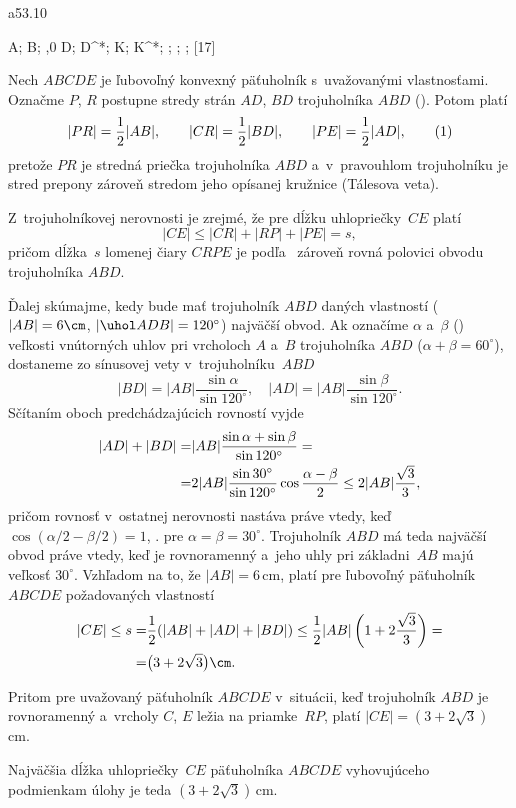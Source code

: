 {%
\epsplace a53.10 \hfil\Obr

\fontplace
\trpoint A; \tlpoint B;
\bpoint{},0 D; \bpoint D^*;
\lBpoint K; \lBpoint K^*;
\cpoint\omega; \cpoint\omega; \cpoint{}\omega;
[17] \hfil\Obr

Nech $ABCDE$ je ľubovoľný konvexný päťuholník s~uvažovanými
vlastnosťami. Označme $P$, $R$ postupne stredy strán $AD$, $BD$
trojuholníka $ABD$ (\obr). Potom platí
$$
|PR|=\frac12|AB|,\qquad |CR|=\frac12|BD|,\qquad |PE|=\frac12|AD|,
\tag1
$$
pretože $PR$ je stredná priečka trojuholníka $ABD$ a~v~pravouhlom
trojuholníku je stred prepony zároveň stredom jeho opísanej kružnice
(Tálesova veta).
\inspicture{}

Z~trojuholníkovej nerovnosti je zrejmé, že pre dĺžku uhlopriečky~$CE$ platí
$$
|CE|\leq |CR|+|RP|+|PE|=s,
$$
pričom dĺžka~$s$ lomenej čiary $CRPE$ je podľa~ zároveň rovná
polovici obvodu trojuholníka $ABD$.

Ďalej skúmajme, kedy bude mať trojuholník $ABD$ daných vlastností
($|AB|=6\cm$, $|\uhol ADB|=120^\circ$) najväčší obvod.
Ak označíme $\alpha$ a~$\beta$ () veľkosti vnútorných uhlov
pri vrcholoch $A$ a~$B$ trojuholníka $ABD$ ($\alpha+\beta=60^{\circ}$),
dostaneme zo sínusovej vety v~trojuholníku~$ABD$
$$
|BD|=|AB|\frac{\sin\alpha}{\sin 120^{\circ}},\quad
|AD|=|AB|\frac{\sin\beta}{\sin 120^{\circ}}.
$$
Sčítaním oboch predchádzajúcich rovností vyjde
$$
\aligned
|AD|+|BD|=&|AB|\frac{\sin\alpha+\sin\beta}{\sin 120^{\circ}}=\\
   =&2|AB|\frac{\sin 30^{\circ}}{\sin 120^{\circ}}
   \cos\frac{\alpha-\beta}2\leq 2|AB|\frac{\sqrt{3}}3,
\endaligned
$$
pričom rovnosť v~ostatnej nerovnosti nastáva práve vtedy, keď
$\cos(\alpha/2-\beta/2)=1$, \tj. pre $\alpha=\beta=30^{\circ}$.
Trojuholník $ABD$ má teda najväčší obvod práve vtedy, keď je
rovnoramenný a~jeho uhly pri základni~$AB$ majú veľkosť
$30^{\circ}$. Vzhľadom na to, že $|AB|=6$\,cm, platí pre
ľubovoľný päťuholník $ABCDE$ požadovaných vlastností
$$
\aligned
|CE|\leq s=&\frac12(|AB|+|AD|+|BD|)\le
    \frac12|AB|\left(1+2\frac{\sqrt{3}}3\right)=\\
          =&\bigl(3+2\sqrt{3}\bigr)\cm.
\endaligned
$$

Pritom pre uvažovaný päťuholník $ABCDE$ v~situácii, keď
trojuholník $ABD$ je rovnoramenný a~vrcholy $C$, $E$ ležia na
priamke~$RP$, platí $|CE|=(3+2\sqrt{3})$\,cm.

Najväčšia dĺžka uhlopriečky~$CE$ päťuholníka $ABCDE$ vyhovujúceho
podmienkam úlohy je teda $(3+2\sqrt{3})$\,cm.

}

